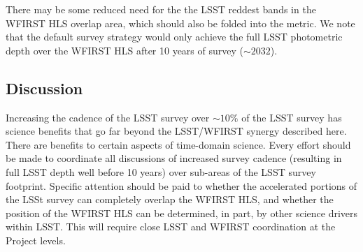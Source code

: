 There may be some reduced need for the the LSST reddest bands in the
WFIRST HLS overlap area, which should also be folded into the metric.
We note that
the default survey strategy would only achieve the full LSST photometric
depth over the WFIRST HLS after 10 years of survey ($\sim2032$).



%
%
%

\subsection{Discussion}
\label{sec:\secname:discussion}

Increasing the cadence of the LSST survey over $\sim10\%$ of the LSST
survey has science benefits that go far beyond the LSST/WFIRST synergy
described here.  There are benefits to certain aspects of time-domain
science.  Every effort should be made to coordinate all discussions of
increased survey cadence (resulting in full LSST depth well before 10
years) over sub-areas of the LSST survey footprint.  Specific attention
should be paid to whether the accelerated portions of the LSSt survey
can completely overlap the WFIRST HLS, and whether the position of the
WFIRST HLS can be determined, in part, by other science drivers within
LSST.  This will require close LSST and WFIRST coordination at the
Project levels.



\navigationbar
